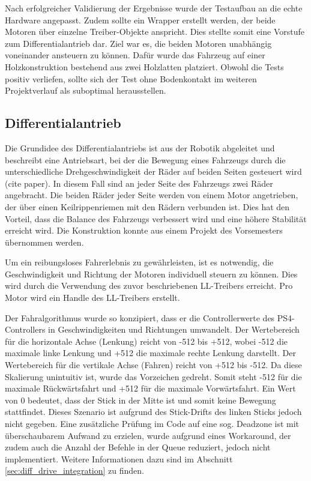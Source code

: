 Nach erfolgreicher Validierung der Ergebnisse wurde der Testaufbau an die echte Hardware angepasst. Zudem sollte ein Wrapper erstellt werden, der beide Motoren über einzelne Treiber-Objekte anspricht. Dies stellte somit eine Vorstufe zum Differentialantrieb dar. Ziel war es, die beiden Motoren unabhängig voneinander ansteuern zu können. Dafür wurde das Fahrzeug auf einer Holzkonstruktion bestehend aus zwei Holzlatten platziert. Obwohl die Tests positiv verliefen, sollte sich der Test ohne Bodenkontakt im weiteren Projektverlauf als suboptimal herausstellen.

\subsection{Differentialantrieb}

Die Grundidee des Differentialantriebs ist aus der Robotik abgeleitet und beschreibt eine Antriebsart, bei der die Bewegung eines Fahrzeugs durch die unterschiedliche Drehgeschwindigkeit der Räder auf beiden Seiten gesteuert wird (cite paper). In diesem Fall sind an jeder Seite des Fahrzeugs zwei Räder angebracht. Die beiden Räder jeder Seite werden von einem Motor angetrieben, der über einen Keilrippenriemen mit den Rädern verbunden ist. Dies hat den Vorteil, dass die Balance des Fahrzeugs verbessert wird und eine höhere Stabilität erreicht wird. Die Konstruktion konnte aus einem Projekt des Vorsemesters übernommen werden. \newline

Um ein reibungsloses Fahrerlebnis zu gewährleisten, ist es notwendig, die Geschwindigkeit und Richtung der Motoren individuell steuern zu können. Dies wird durch die Verwendung des zuvor beschriebenen LL-Treibers erreicht. Pro Motor wird ein Handle des LL-Treibers erstellt. \newline

Der Fahralgorithmus wurde so konzipiert, dass er die Controllerwerte des PS4-Controllers in Geschwindigkeiten und Richtungen umwandelt. Der Wertebereich für die horizontale Achse (Lenkung) reicht von -512 bis +512, wobei -512 die maximale linke Lenkung und +512 die maximale rechte Lenkung darstellt. Der Wertebereich für die vertikale Achse (Fahren) reicht von +512 bis -512. Da diese Skalierung unintuitiv ist, wurde das Vorzeichen gedreht. Somit steht -512 für die maximale Rückwärtsfahrt und +512 für die maximale Vorwärtsfahrt. Ein Wert von 0 bedeutet, dass der Stick in der Mitte ist und somit keine Bewegung stattfindet. Dieses Szenario ist aufgrund des Stick-Drifts des linken Sticks jedoch nicht gegeben. Eine zusätzliche Prüfung im Code auf eine sog. Deadzone ist mit überschaubarem Aufwand zu erzielen, wurde aufgrund eines Workaround, der zudem auch die Anzahl der Befehle in der Queue reduziert, jedoch nicht implementiert. Weitere Informationen dazu sind im Abschnitt \ref{sec:diff_drive_integration} zu finden. \newline

